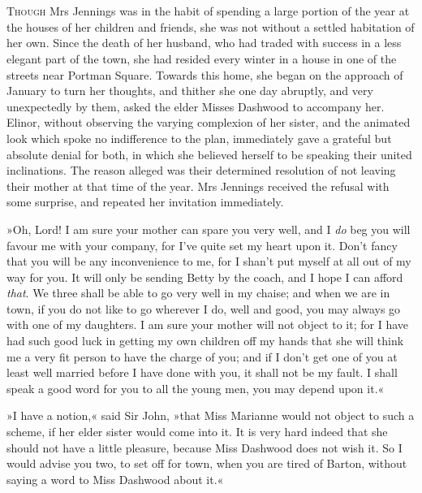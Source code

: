 \chapter[Chapter \thechapter]{}
\lettrine[lines=4,lraise=0.3]{T}{hough} Mrs Jennings was in the habit of spending a large portion of the year at the houses of her children and friends, she was not without a settled habitation of her own. Since the death of her husband, who had traded with success in a less elegant part of the town, she had resided every winter in a house in one of the streets near Portman Square. Towards this home, she began on the approach of January to turn her thoughts, and thither she one day abruptly, and very unexpectedly by them, asked the elder Misses Dashwood to accompany her. Elinor, without observing the varying complexion of her sister, and the animated look which spoke no indifference to the plan, immediately gave a grateful but absolute denial for both, in which she believed herself to be speaking their united inclinations. The reason alleged was their determined resolution of not leaving their mother at that time of the year. Mrs Jennings received the refusal with some surprise, and repeated her invitation immediately.

»Oh, Lord! I am sure your mother can spare you very well, and I \textit{do} beg you will favour me with your company, for I’ve quite set my heart upon it. Don’t fancy that you will be any inconvenience to me, for I shan’t put myself at all out of my way for you. It will only be sending Betty by the coach, and I hope I can afford \textit{that}. We three shall be able to go very well in my chaise; and when we are in town, if you do not like to go wherever I do, well and good, you may always go with one of my daughters. I am sure your mother will not object to it; for I have had such good luck in getting my own children off my hands that she will think me a very fit person to have the charge of you; and if I don’t get one of you at least well married before I have done with you, it shall not be my fault. I shall speak a good word for you to all the young men, you may depend upon it.«

»I have a notion,« said Sir John, »that Miss Marianne would not object to such a scheme, if her elder sister would come into it. It is very hard indeed that she should not have a little pleasure, because Miss Dashwood does not wish it. So I would advise you two, to set off for town, when you are tired of Barton, without saying a word to Miss Dashwood about it.«

